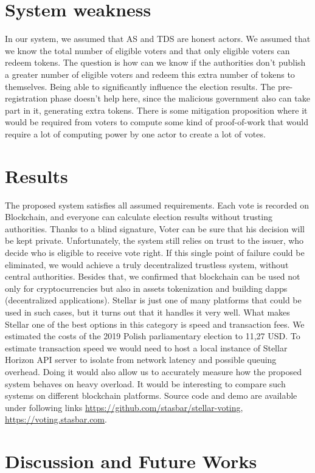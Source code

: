 \documentclass[runningheads]{llncs}
\begin{document}
\section{System weakness}
In our system, we assumed that AS and TDS are honest actors. We assumed that we know the total number of eligible voters and that only eligible voters can redeem tokens. The question is how can we know if the authorities don't publish a greater number of eligible voters and redeem this extra number of tokens to themselves. Being able to significantly influence the election results. The pre-registration phase doesn't help here, since the malicious government also can take part in it, generating extra tokens. There is some mitigation proposition where it would be required from voters to compute some kind of proof-of-work that would require a lot of computing power by one actor to create a lot of votes.

\section{Results}
The proposed system satisfies all assumed requirements. Each vote is recorded on Blockchain, and everyone can calculate election results without trusting authorities. Thanks to a blind signature, Voter can be sure that his decision will be kept private. Unfortunately, the system still relies on trust to the issuer, who decide who is eligible to receive vote right. If this single point of failure could be eliminated, we would achieve a truly decentralized trustless system, without central authorities.
Besides that, we confirmed that blockchain can be used not only for cryptocurrencies but also in assets tokenization and building dapps (decentralized applications). Stellar is just one of many platforms that could be used in such cases, but it turns out that it handles it very well. What makes Stellar one of the best options in this category is speed and transaction fees. We estimated the costs of the 2019 Polish parliamentary election to 11,27 USD. To estimate transaction speed we would need to host a local instance of Stellar Horizon API server to isolate from network latency and possible queuing overhead. Doing it would also allow us to accurately measure how the proposed system behaves on heavy overload. It would be interesting to compare such systems on different blockchain platforms. Source code and demo are available under following links \url{https://github.com/stasbar/stellar-voting}, \url{https://voting.stasbar.com}.

\section{Discussion and Future Works}



\end{document}
